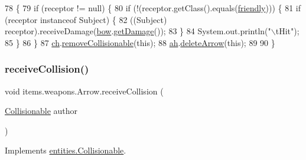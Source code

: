 \begin{DoxyCode}
78                                                     \{
79         \textcolor{keywordflow}{if} (receptor != null) \{
80             \textcolor{keywordflow}{if} (!(receptor.getClass().equals(\mbox{\hyperlink{classitems_1_1weapons_1_1_arrow_a3b020ae7197868d31adf452c56fd00ec}{friendly}}))) \{
81                 \textcolor{keywordflow}{if} (receptor instanceof Subject) \{
82                     ((Subject) receptor).receiveDamage(\mbox{\hyperlink{classitems_1_1weapons_1_1_arrow_a40f42a19ccd51554f27628716170d1f3}{bow}}.\mbox{\hyperlink{classitems_1_1weapons_1_1_weapon_ac77d8b8350bf90ab04a2f8869f73358c}{getDamage}}());
83                 \}
84                 System.out.println(\textcolor{stringliteral}{"\(\backslash\)tHit"});
85             \}
86         \}
87         \mbox{\hyperlink{classitems_1_1weapons_1_1_arrow_aca68c367f384774a6c0dc1c123ca4138}{ch}}.\mbox{\hyperlink{classentities_1_1_collision_handler_a0634abfade22196f7c8292dca6d4c883}{removeCollisionable}}(\textcolor{keyword}{this});
88         \mbox{\hyperlink{classitems_1_1weapons_1_1_arrow_a53eef20648312917e2c7b4405cd24c2c}{ah}}.\mbox{\hyperlink{classitems_1_1weapons_1_1_arrow_handler_ab7e4dce0dc3cd385a870fe54ca1cabf1}{deleteArrow}}(\textcolor{keyword}{this});
89 
90     \}
\end{DoxyCode}
\mbox{\label{classitems_1_1weapons_1_1_arrow_ae73288a331d5f87316ddf1f6e7d113ca}} 
\subsubsection{\texorpdfstring{receive\+Collision()}{receiveCollision()}}
{\footnotesize\ttfamily void items.\+weapons.\+Arrow.\+receive\+Collision (\begin{DoxyParamCaption}\item[{\mbox{\hyperlink{interfaceentities_1_1_collisionable}{Collisionable}}}]{author }\end{DoxyParamCaption})\hspace{0.3cm}{\ttfamily [inline]}}



Implements \mbox{\hyperlink{interfaceentities_1_1_collisionable_a956a85182fef376af333622e844342e3}{entities.\+Collisionable}}.


